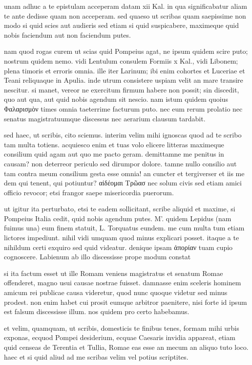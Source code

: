 


 unam adhuc a te epistulam acceperam datam xii Kal. in qua significabatur aliam te ante dedisse quam non acceperam. sed quaeso ut scribas quam saepissime non modo si quid scies aut audieris sed etiam si quid suspicabere, maximeque quid nobis faciendum aut non faciendum putes.

 nam quod rogas curem ut scias quid Pompeius agat, ne ipsum quidem scire puto; nostrum quidem nemo. vidi Lentulum consulem Formiis x Kal., vidi Libonem; plena timoris et erroris omnia. ille iter Larinum; ibi enim cohortes et Luceriae et Teani reliquaque in Apulia. inde utrum consistere uspiam velit an mare transire nescitur. si manet, vereor ne exercitum firmum habere non possit; sin discedit, quo aut qua, aut quid nobis agendum sit nescio. nam istum quidem quoius Φαλαρισμὸν times omnia taeterrime facturum puto. nec eum rerum prolatio nec senatus magistratuumque discessus nec aerarium clausum tardabit.

 sed haec, ut scribis, cito sciemus. interim velim mihi ignoscas quod ad te scribo tam multa totiens. acquiesco enim et tuas volo elicere litteras maximeque consilium quid agam aut quo me pacto geram. demittamne me penitus in causam? non deterreor periculo sed dirumpor dolore. tamne nullo consilio aut tam contra meum consilium gesta esse omnia! an cuncter et tergiverser et iis me dem qui tenent, qui potiuntur? αἰδέομαι Τρῶασ nec solum civis sed etiam amici officio revocor; etsi frangor saepe misericordia puerorum.

 ut igitur ita perturbato, etsi te eadem sollicitant, scribe aliquid et maxime, si Pompeius Italia cedit, quid nobis agendum putes. M'. quidem Lepidus (nam fuimus una) eum finem statuit, L. Torquatus eundem. me cum multa tum etiam lictores impediunt. nihil vidi umquam quod minus explicari posset. itaque a te nihildum certi exquiro sed quid videatur. denique ipsam ἀπορίαν tuam cupio cognoscere. Labienum ab illo discessisse prope modum constat

 si ita factum esset ut ille Romam veniens magistratus et senatum Romae offenderet, magno usui causae nostrae fuisset. damnasse enim sceleris hominem amicum rei publicae causa videretur, quod nunc quoque videtur sed minus prodest. non enim habet cui prosit eumque arbitror paenitere, nisi forte id ipsum est falsum discessisse illum. nos quidem pro certo habebamus.

 et velim, quamquam, ut scribis, domesticis te finibus tenes, formam mihi urbis exponas, ecquod Pompei desiderium, ecquae Caesaris invidia appareat, etiam quid censeas de Terentia et Tullia, Romae eas esse an mecum an aliquo tuto loco. haec et si quid aliud ad me scribas velim vel potius scriptites.
